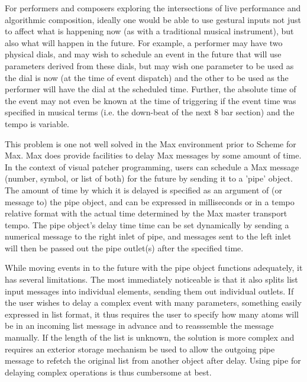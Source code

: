 \documentclass[acmsmall]{acmart}
\begin{document}
For performers and composers exploring the intersections of live performance and algorithmic
composition, ideally one would be able to use gestural inputs not just to affect
what is happening now (as with a traditional musical instrument), but also what will 
happen in the future. For example, a performer may have two physical dials,
and may wish to schedule an event in the future that will use parameters derived
from these dials, but may wish one parameter to be used as the dial is now
(at the time of event dispatch) 
and the other to be used as the performer will have the dial at the scheduled time.
Further, the absolute time of the event may not even be known at the time of 
triggering if the event time was specified in musical terms 
(i.e. the down-beat of the next 8 bar section) and the tempo is variable. 

This problem is one not well solved in the Max environment prior 
to Scheme for Max. Max does provide facilities to delay Max messages by some
amount of time. In the context of visual patcher programming, users can schedule 
a Max message (number, symbol, or list of both) for the future by sending it to a 
'pipe' object. The amount of time by which it is delayed is specified as an argument of
(or message to) the pipe object, and can be expressed in milliseconds or in a tempo 
relative format with the actual time determined by the Max master transport tempo. 
The pipe object’s delay time time can be set dynamically by sending a numerical message
to the right inlet of pipe, and messages sent to the left inlet will then be passed out
the pipe outlet(s) after the specified time. 

While moving events in to the future with the pipe object functions adequately, 
it has several limitations. The most immediately noticeable is that it also splits 
list input messages into individual elements, sending them out individual outlets. 
If the user wishes to delay a complex event with many parameters, something easily 
expressed in list format, it thus requires the user to specify how many atoms will 
be in an incoming list message in advance and to reasssemble the message manually.
If the length of the list is unknown, the solution is more complex and requires 
an exterior storage mechanism be used to allow the outgoing 
pipe message to refetch the original list from another object after delay. Using
pipe for delaying complex operations is thus cumbersome at best. 
\end{document}
